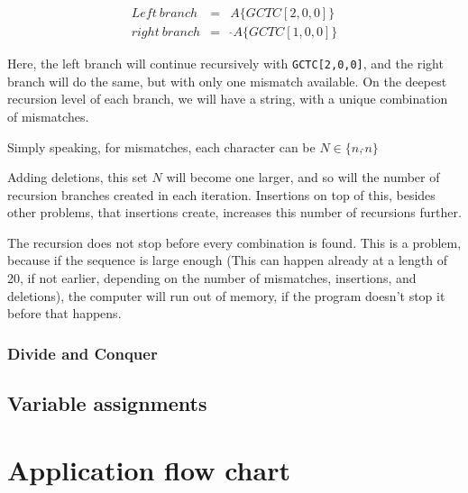 \documentclass[12pt]{article}
\begin{document}
\begin{eqnarray}
	Left\ branch &=& A\{GCTC[2,0,0]\} \\
	right\ branch &=&\ \hat{}A\{GCTC[1,0,0]\}
\end{eqnarray}

Here, the left branch will continue recursively with \texttt{GCTC[2,0,0]}, and the right branch will do the same, but with only one mismatch available. On the deepest recursion level of each branch, we will have a string, with a unique combination of mismatches.

Simply speaking, for mismatches, each character can be $N \in \{n, \hat{}n\}$

Adding deletions, this set $N$ will become one larger, and so will the number of recursion branches created in each iteration. Insertions on top of this, besides other problems, that insertions create, increases this number of recursions further.

The recursion does not stop before every combination is found. This is a problem, because if the sequence is large enough (This can happen already at a length of 20, if not earlier, depending on the number of mismatches, insertions, and deletions), the computer will run out of memory, if the program doesn't stop it before that happens.

\subsubsection{Divide and Conquer}

\subsection{Variable assignments}



\section{Application flow chart}
\end{document}
